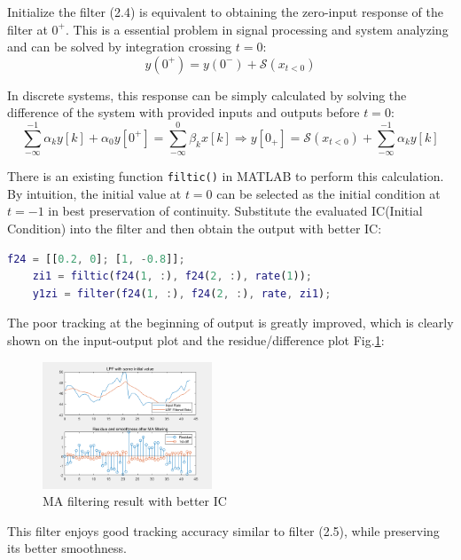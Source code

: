 \documentclass[conference]{IEEEtran}
\begin{document}
Initialize the filter (2.4) is equivalent to obtaining the zero-input response of the filter at \(0^{+}\). This is a essential problem in signal processing and system analyzing and can be solved by integration crossing \(t=0\):
\begin{equation}
	y(0^{+})=y(0^{-})+\mathcal{S}(x_{t<0})
\end{equation}

In discrete systems, this response can be simply calculated by solving the difference of the system with provided inputs and outputs before \(t=0\):
\begin{equation}
	\sum_{-\infty}^{-1}\alpha_{k}y[k]+\alpha_{0}y[0^{+}]=\sum_{-\infty}^{0}\beta_{k}x[k]\Rightarrow y[0_{+}]=\mathcal{S}(x_{t<0})+\sum_{-\infty}^{-1}\alpha_{k}y[k]
\end{equation}

There is an existing function \lstinline{filtic()} in MATLAB to perform this calculation. By intuition, the initial value at \(t=0\) can be selected as the initial condition at \(t=-1\) in best preservation of continuity. Substitute the evaluated IC(Initial Condition) into the filter and then obtain the output with better IC:
\begin{lstlisting}[language=matlab,style=matlab]
	f24 = [[0.2, 0]; [1, -0.8]];
	zi1 = filtic(f24(1, :), f24(2, :), rate(1));
	y1zi = filter(f24(1, :), f24(2, :), rate, zi1);
\end{lstlisting}

The poor tracking at the beginning of output is greatly improved, which is clearly shown on the input-output plot and the residue/difference plot Fig.\ref{fig:q284}:
\begin{figure}[htpb]
	\centering
	\includegraphics[width=0.45\textwidth]{../matlab/q28_4.png}
	\caption{MA filtering result with better IC}
	\label{fig:q284}
\end{figure}
This filter enjoys good tracking accuracy similar to filter (2.5), while preserving its better smoothness.
\end{document}
